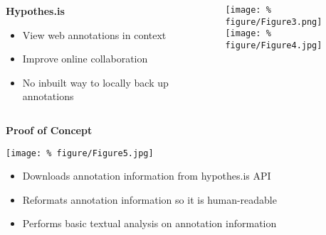 \documentclass[unknownkeysallowed,usepdftitle=false, parskip=full]{beamer}
\newcommand{\secvariable}{nothing}
\newcommand{\mysection}[1]{\renewcommand{\secvariable}{#1}
}
\begin{document}
\mysection{radar}
\begin{frame}\label{\secvariable}
  \begin{columns}[t]
    \begin{column}[c]{0.45\textwidth}
    \parbox{\linewidth}{

\textbf{Hypothes.is}

      \vspace{12pt}
     
\begin{itemize}
\item View web annotations in context
\item Improve online collaboration
\end{itemize}

  \vspace{12pt}
  
\begin{itemize}
\item No inbuilt way to locally back up annotations
\end{itemize}

      }
    \end{column}
    \begin{column}[c]{0.6\textwidth}
\texttt{[image: \%
figure/Figure3.png]}\\
\vspace{12pt}
\texttt{[image: \%
figure/Figure4.jpg]}
    \end{column}
  \end{columns}

  
\end{frame}

\mysection{line}
\begin{frame}\label{\secvariable}
\begin{center}
  \vspace{-0.5cm}
      \parbox{\linewidth}{\textbf{Proof of Concept}}
\texttt{[image: \%
  figure/Figure5.jpg]}

\end{center}
  \vspace{-0.2cm}
      \parbox{\linewidth}{
      
\begin{itemize}
\item  Downloads annotation information from hypothes.is API
\item Reformats annotation information so it is human-readable
\item Performs basic textual analysis on annotation information
\end{itemize}
  }
\end{frame}
\end{document}
